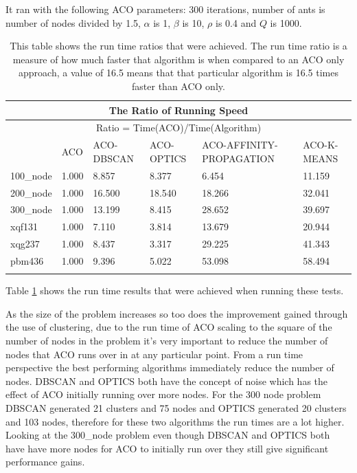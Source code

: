 It ran with the following ACO parameters: 300 iterations, number of ants is number of nodes divided by 1.5, $\alpha$ is 1, $\beta$ is 10, $\rho$ is 0.4 and $Q$ is 1000.

\begin{longtable}[c]{|p{2cm}|p{1cm}|p{2cm}|p{2cm}|p{3cm}|p{2cm}|}
\hline
\multicolumn{6}{|c|}{The Ratio of Running Speed}                                     \\ \hline
\endhead
%
\multicolumn{6}{|c|}{Ratio = Time(ACO)/Time(Algorithm)}                              \\ \hline
          & ACO   & ACO-DBSCAN & ACO-OPTICS & ACO-AFFINITY-PROPAGATION & ACO-K-MEANS \\ \hline
100\_node & 1.000 & 8.857      & 8.377      & 6.454                    & 11.159      \\ \hline
200\_node & 1.000 & 16.500     & 18.540     & 18.266                   & 32.041      \\ \hline
300\_node & 1.000 & 13.199     & 8.415      & 28.652                   & 39.697      \\ \hline
xqf131    & 1.000 & 7.110      & 3.814      & 13.679                   & 20.944      \\ \hline
xqg237    & 1.000 & 8.437      & 3.317      & 29.225                   & 41.343      \\ \hline
pbm436    & 1.000 & 9.396      & 5.022      & 53.098                   & 58.494      \\ \hline
\caption{This table shows the run time ratios that were achieved. The run time ratio is a measure of how much faster that algorithm is when compared to an ACO only approach, a value of 16.5 means that that particular algorithm is 16.5 times faster than ACO only. }
\label{tab:run_time_table_question_1}\\
\end{longtable}

Table \ref{tab:run_time_table_question_1} shows the run time results that were achieved when running these tests.

As the size of the problem increases so too does the improvement gained through the use of clustering, due to the run time of ACO scaling to the square of the number of nodes in the problem it's very important to reduce the number of nodes that ACO runs over in at any particular point. From a run time perspective the best performing algorithms immediately reduce the number of nodes. DBSCAN and OPTICS both have the concept of noise which has the effect of ACO initially running over more nodes. For the 300 node problem DBSCAN generated 21 clusters and 75 nodes and OPTICS generated 20 clusters and 103 nodes, therefore for these two algorithms the run times are a lot higher. Looking at the 300\_node problem even though DBSCAN and OPTICS both have have more nodes for ACO to initially run over they still give significant performance gains.


